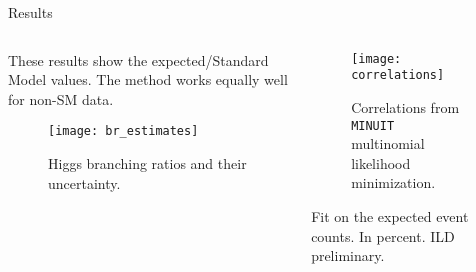 \begin{block}{Results}
\begin{columns}
\begin{column}{.5\textwidth}
    These results show the expected/Standard Model values.
    The method works equally well for non-SM data.
    \begin{figure}
    \begin{minipage}{0.94\textwidth}
        \centering\texttt{[image: br\_estimates]}
        \caption{Higgs branching ratios and their uncertainty.}
    \end{minipage}
    \end{figure}
\end{column}
\begin{column}{.3\textwidth}
    \begin{figure}
    \begin{minipage}{0.94\textwidth}
        \centering\texttt{[image: correlations]}
        \caption{Correlations from \texttt{MINUIT} multinomial likelihood minimization.}
        \label{fig:correlations}
    \end{minipage}
    \end{figure}
    \begin{table}
        \caption{Fit on the
            expected event counts. In percent. ILD preliminary.}\label{tab:brs}
    \end{table}
\end{column}
\end{columns}
\end{block}
